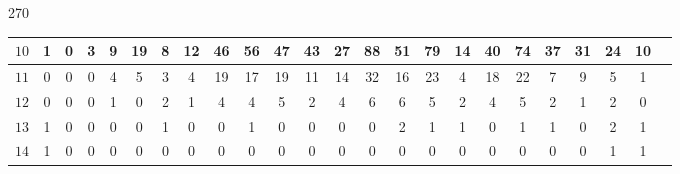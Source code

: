 \documentclass[12pt]{book}
\theoremstyle{definition}
\newcounter{in}
\begin{document}
\begin{table}[t]
\begin{turn}{270}
\begin{tabular}{| c | c | c | c | c | c | c | c | c |  c | c | c | c | c | c | c | c | c | c | c | c | c | c | c | }
$10$ & 1 & 0 & 3 & 9 & 19 & 8 & 12 & 46 & 56 & 47 & 43 & 27 & 88 & 51 & 79 & 14 & 40 & 74 & 37 & 31 & 24 & 10 \\ \hline
$11$ & 0 & 0 & 0 & 4 & 5 & 3 & 4 & 19 & 17 & 19 & 11 & 14 & 32 & 16 & 23 & 4 & 18 & 22 & 7 & 9 & 5 & 1 \\ \hline
$12$ & 0 & 0 & 0 & 1 & 0 & 2 & 1 & 4 & 4 & 5 & 2 & 4 & 6 & 6 & 5 & 2 & 4 & 5 & 2 & 1 & 2 & 0 \\ \hline
$13$ & 1 & 0 & 0 & 0 & 0 & 1 & 0 & 0 & 1 & 0 & 0 & 0 & 0 & 2 & 1 & 1 & 0 & 1 & 1 & 0 & 2 & 1 \\ \hline
$14$ & 1 & 0 & 0 & 0 & 0 & 0 & 0 & 0 & 0 & 0 & 0 & 0 & 0 & 0 & 0 & 0 & 0 & 0 & 0 & 0 & 1 & 1 \\ \hline

\end{tabular}
\end{turn}
\end{table}





























\backmatter




\printindex
\end{document}
